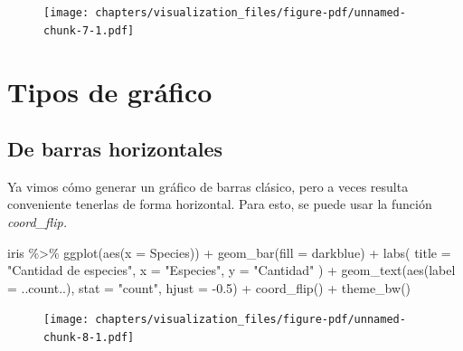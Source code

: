 \documentclass[
  letterpaper,
  DIV=11,
  numbers=noendperiod]{scrreprt}
\newenvironment{Shaded}{\begin{snugshade}}{\end{snugshade}}
\newcommand{\AttributeTok}[1]{\textcolor[rgb]{0.40,0.45,0.13}{#1}}
\newcommand{\FloatTok}[1]{\textcolor[rgb]{0.68,0.00,0.00}{#1}}
\newcommand{\FunctionTok}[1]{\textcolor[rgb]{0.28,0.35,0.67}{#1}}
\newcommand{\NormalTok}[1]{\textcolor[rgb]{0.00,0.23,0.31}{#1}}
\newcommand{\SpecialCharTok}[1]{\textcolor[rgb]{0.37,0.37,0.37}{#1}}
\newcommand{\StringTok}[1]{\textcolor[rgb]{0.13,0.47,0.30}{#1}}
\begin{document}
\begin{figure}[H]

{\centering \texttt{[image: chapters/visualization\_files/figure-pdf/unnamed-chunk-7-1.pdf]}

}

\end{figure}

\hypertarget{tipos-de-gruxe1fico}{%
\section{Tipos de gráfico}\label{tipos-de-gruxe1fico}}

\hypertarget{de-barras-horizontales}{%
\subsection{De barras horizontales}\label{de-barras-horizontales}}

Ya vimos cómo generar un gráfico de barras clásico, pero a veces resulta
conveniente tenerlas de forma horizontal. Para esto, se puede usar la
función \emph{coord\_flip.}

\begin{Shaded}
\begin{Highlighting}[]
\NormalTok{iris }\SpecialCharTok{\%\textgreater{}\%} 
  \FunctionTok{ggplot}\NormalTok{(}\FunctionTok{aes}\NormalTok{(}\AttributeTok{x =}\NormalTok{ Species)) }\SpecialCharTok{+}
  \FunctionTok{geom\_bar}\NormalTok{(}\AttributeTok{fill =} \StringTok{\textquotesingle{}darkblue\textquotesingle{}}\NormalTok{) }\SpecialCharTok{+}
  \FunctionTok{labs}\NormalTok{(}
    \AttributeTok{title =} \StringTok{"Cantidad de especies"}\NormalTok{,}
    \AttributeTok{x =} \StringTok{"Especies"}\NormalTok{,}
    \AttributeTok{y =} \StringTok{"Cantidad"}
\NormalTok{  ) }\SpecialCharTok{+}
  \FunctionTok{geom\_text}\NormalTok{(}\FunctionTok{aes}\NormalTok{(}\AttributeTok{label =}\NormalTok{ ..count..), }\AttributeTok{stat =} \StringTok{"count"}\NormalTok{, }\AttributeTok{hjust =} \SpecialCharTok{{-}}\FloatTok{0.5}\NormalTok{) }\SpecialCharTok{+}
  \FunctionTok{coord\_flip}\NormalTok{() }\SpecialCharTok{+}
  \FunctionTok{theme\_bw}\NormalTok{()}
\end{Highlighting}
\end{Shaded}

\begin{figure}[H]

{\centering \texttt{[image: chapters/visualization\_files/figure-pdf/unnamed-chunk-8-1.pdf]}

}

\end{figure}
\end{document}
